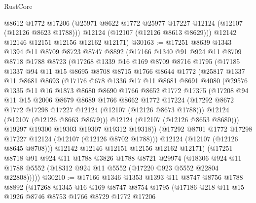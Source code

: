 \begin{lexlean}{RustCore}
\begin{coremodule}
        @8612
        @1772
        @17206
        (@25971 @8622 @1772 @25977 @17227 @12124 (@12107 (@12126 @8623 @1788)))
        @12124
        (@12107 (@12126 @8613 @8629)))
      @12142
      @12146
      @12151
      @12156
      @12162
      @12171)
@30163 := @17251
    @8639
    @1343
    @1394
    @11
    @8709
    @8723
    @8747
    @8892
    (@17166
      @1340
      @91
      @924
      @11
      @8709
      @8718
      @1788
      @8723
      (@17268
        @1339
        @16
        @169
        @8709
        @8716
        @1795
        (@17185
          @1337
          @94
          @11
          @15
          @8695
          @8708
          @8715
          @1766
          @8644
          @1772
          (@25817
            @1337
            @11
            @8681
            @8693
            (@17176
              @678
              @1336
              @17
              @11
              @8681
              @8691
              @4080
              (@29576
                @1335
                @11
                @16
                @1873
                @8680
                @8690
                @1766
                @8652
                @1772
                @17375
                (@17208
                  @94
                  @11
                  @15
                  @2006
                  @8679
                  @8689
                  @1766
                  @8662
                  @1772
                  @17224
                  (@17292 @8672 @1772 @17298 @17227 @12124 (@12107 (@12126 @8673 @1788)))
                  @12124
                  (@12107 (@12126 @8663 @8679)))
                @12124
                (@12107 (@12126 @8653 @8680)))
              @19297
              @19300
              @19303
              @19307
              @19312
              @19318))
          (@17292 @8701 @1772 @17298 @17227 @12124 (@12107 (@12126 @8702 @1788)))
          @12124
          (@12107 (@12126 @8645 @8708)))
        @12142
        @12146
        @12151
        @12156
        @12162
        @12171)
      (@17251
        @8718
        @91
        @924
        @11
        @1788
        @3826
        @1788
        @8721
        @29974
        (@18306 @924 @11 @1788 @5552 (@18312 @924 @11 @5552 (@17220 @923 @5552 @22804 @22808)))))
@30210 := @17166
    @1346
    @1353
    @1393
    @11
    @8747
    @8756
    @1788
    @8892
    (@17268
      @1345
      @16
      @169
      @8747
      @8754
      @1795
      (@17186
        @218
        @11
        @15
        @1926
        @8746
        @8753
        @1766
        @8729
        @1772
        @17206

\end{coremodule}
\end{lexlean}
